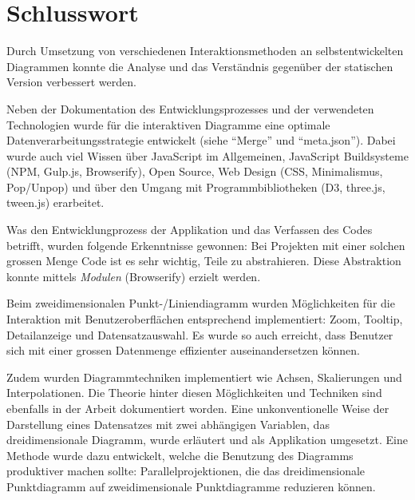 \chapter{Schlusswort}

Durch Umsetzung von verschiedenen Interaktionsmethoden an selbstentwickelten Diagrammen konnte die Analyse und das Verständnis gegenüber der statischen Version verbessert werden.

Neben der Dokumentation des Entwicklungsprozesses und der verwendeten Technologien wurde für die interaktiven Diagramme eine optimale Datenverarbeitungsstrategie entwickelt (siehe "`Merge"' und "`meta.json"'). Dabei wurde auch viel Wissen über JavaScript im Allgemeinen, JavaScript Buildsysteme (NPM, Gulp.js, Browserify), Open Source, Web Design (CSS, Minimalismus, Pop/Unpop) und über den Umgang mit Programmbibliotheken (D3, three.js, tween.js) erarbeitet.

Was den Entwicklungprozess der Applikation und das Verfassen des Codes betrifft, wurden folgende Erkenntnisse gewonnen: Bei Projekten mit einer solchen grossen Menge Code ist es sehr wichtig, Teile zu abstrahieren. Diese Abstraktion konnte mittels \textit{Modulen} (Browserify) erzielt werden.

Beim zweidimensionalen Punkt-/Liniendiagramm wurden Möglichkeiten für die Interaktion mit Benutzeroberflächen entsprechend implementiert: Zoom, Tooltip, Detailanzeige und Datensatzauswahl. Es wurde so auch erreicht, dass Benutzer sich mit einer grossen Datenmenge effizienter auseinandersetzen können. 

Zudem wurden Diagrammtechniken implementiert wie Achsen, Skalierungen und Interpolationen. Die Theorie hinter diesen Möglichkeiten und Techniken sind ebenfalls in der Arbeit dokumentiert worden.
\newpage
Eine unkonventionelle Weise der Darstellung eines Datensatzes mit zwei abhängigen Variablen, das dreidimensionale Diagramm, wurde erläutert und als Applikation umgesetzt. Eine Methode wurde dazu entwickelt, welche die Benutzung des Diagramms produktiver machen sollte: Parallelprojektionen, die das dreidimensionale Punktdiagramm auf zweidimensionale Punktdiagramme reduzieren können.
